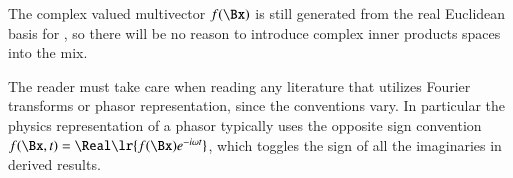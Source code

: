The complex valued multivector \( f(\Bx) \) is still generated from the real Euclidean basis for , so
there will be
no reason to introduce complex inner products spaces into the mix.

The reader must take care when reading any literature that utilizes Fourier transforms or phasor representation, since the conventions vary.
In particular the physics representation of a phasor typically uses the opposite sign convention
\( f(\Bx, t) = \Real\lr{ f(\Bx) e^{-i \omega t }} \), which toggles the sign of all the imaginaries in derived results.
